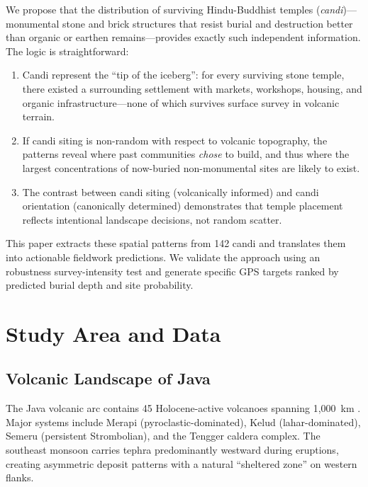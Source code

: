 \documentclass[12pt,a4paper]{article}
\begin{document}
We propose that the distribution of surviving Hindu-Buddhist temples (\emph{candi})---monumental stone and brick structures that resist burial and destruction better than organic or earthen remains---provides exactly such independent information. The logic is straightforward:

\begin{enumerate}
    \item Candi represent the ``tip of the iceberg'': for every surviving stone temple, there existed a surrounding settlement with markets, workshops, housing, and organic infrastructure---none of which survives surface survey in volcanic terrain.
    \item If candi siting is non-random with respect to volcanic topography, the patterns reveal where past communities \emph{chose} to build, and thus where the largest concentrations of now-buried non-monumental sites are likely to exist.
    \item The contrast between candi siting (volcanically informed) and candi orientation (canonically determined) demonstrates that temple placement reflects intentional landscape decisions, not random scatter.
\end{enumerate}

This paper extracts these spatial patterns from 142 candi and translates them into actionable fieldwork predictions. We validate the approach using an robustness survey-intensity test and generate specific GPS targets ranked by predicted burial depth and site probability.

\section{Study Area and Data}

\subsection{Volcanic Landscape of Java}

The Java volcanic arc contains 45 Holocene-active volcanoes spanning 1,000~km \citep{whitten1996, thouret1999}. Major systems include Merapi (pyroclastic-dominated), Kelud (lahar-dominated), Semeru (persistent Strombolian), and the Tengger caldera complex. The southeast monsoon carries tephra predominantly westward during eruptions, creating asymmetric deposit patterns with a natural ``sheltered zone'' on western flanks.
\end{document}
